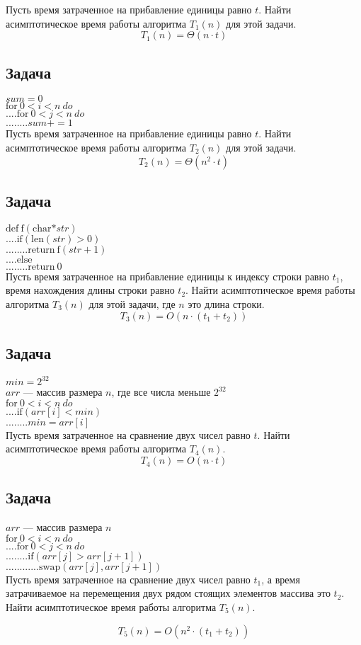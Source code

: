 Пусть время затраченное на прибавление единицы равно $t$. Найти асимптотическое время работы алгоритма  $T_1(n)$ для этой задачи.
$$T_1(n) = \Theta(n\cdot t)$$

\subsection{Задача}
$sum = 0$\\
$\text{for}~0<i<n~do$\\
$....\text{for}~0<j<n~do$\\
$........sum += 1$\\

Пусть время затраченное на прибавление единицы равно $t$. Найти асимптотическое время работы алгоритма  $T_2(n)$ для этой задачи.
$$T_2(n) = \Theta(n^2\cdot t)$$

\subsection{Задача}
$\text{def}~\text{f}(\text{char*} str)$\\
$....\text{if}(\text{len}(str) > 0)$\\
$........\text{return}~\text{f}(str + 1)$\\
$....\text{else}$\\
$........\text{return}~0$\\

Пусть время затраченное на прибавление единицы к индексу строки равно $t_1$, время нахождения длины строки равно $t_2$. Найти асимптотическое время работы алгоритма  $T_3(n)$ для этой задачи, где $n$ это  длина строки.
$$T_3(n) = O(n\cdot (t_1+t_2))$$

\subsection{Задача}
$min = 2^{32}$\\
$arr$ --- массив размера $n$, где все числа меньше $2^{32}$\\
$\text{for}~0<i<n~do$\\
$....\text{if}(arr[i] < min)$\\
$........min = arr[i]$\\

Пусть время затраченное на сравнение двух чисел равно $t$. Найти асимптотическое время работы алгоритма  $T_4(n)$.
$$T_4(n) = O(n\cdot t)$$


\subsection{Задача}
$arr$  --- массив размера $n$\\
$\text{for}~0<i<n~do$\\
$....\text{for}~0<j<n~do$\\
$........\text{if}(arr[j] > arr[j+1])$\\
$............\text{swap}(arr[j], arr[j+1])$\\

Пусть время затраченное на сравнение двух чисел равно $t_1$, а время затрачиваемое на перемещения двух рядом стоящих элементов массива это $t_2$. Найти асимптотическое время работы алгоритма  $T_5(n)$.

$$T_5(n) = O(n^2\cdot (t_1+t_2))$$
